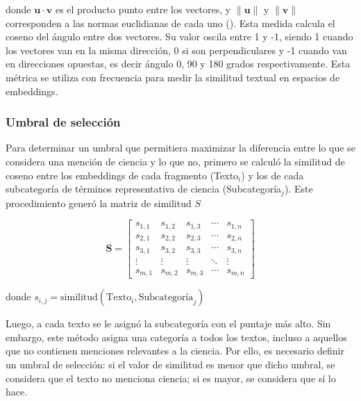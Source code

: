 \documentclass[11pt,a4paper]{article}
\begin{document}
	donde $\mathbf{u} \cdot \mathbf{v}$ es el producto punto entre los vectores, y 
	$\|\mathbf{u}\|$ y $\|\mathbf{v}\|$ corresponden a las normas euclidianas de cada uno (\cite{Jurafsky2025}). Esta medida calcula el coseno del ángulo entre dos vectores. Su valor oscila entre 1 y -1, siendo 1 cuando los vectores van en la misma dirección, 0 si son perpendiculares y -1 cuando van en direcciones opuestas, es decir ángulo 0, 90 y 180 grados respectivamente. Esta métrica se utiliza con frecuencia para medir la similitud textual en espacios de embeddings.\\
	
	

	\subsubsection{Umbral de selección}
	
	
	Para determinar un umbral que permitiera maximizar la diferencia entre lo que se considera una mención de ciencia y lo que no, primero se calculó la similitud de coseno entre los embeddings de cada fragmento (Texto$_i$) y los de cada subcategoría de términos representativa de ciencia (Subcategoría$_j$). Este procedimiento generó la matriz de similitud $S$
	
	\begin{equation}
		\mathbf{S} =
		\begin{bmatrix}
			s_{1,1} & s_{1,2} & s_{1,3} & \cdots & s_{1,n} \\
			s_{2,1} & s_{2,2} & s_{2,3} & \cdots & s_{2,n} \\
			s_{3,1} & s_{3,2} & s_{3,3} & \cdots & s_{3,n} \\
			\vdots  & \vdots  & \vdots  & \ddots & \vdots  \\
			s_{m,1} & s_{m,2} & s_{m,3} & \cdots & s_{m,n}
		\end{bmatrix}
	\end{equation}
	
	donde $ s_{i,j} = \text{similitud}( \text{Texto}_i, \text{Subcategoría}_j )$
	
	Luego, a cada texto se le asignó la subcategoría con el puntaje más alto. Sin embargo, este método asigna una categoría a todos los textos, incluso a aquellos que no contienen menciones relevantes a la ciencia. Por ello, es necesario definir un umbral de selección: si el valor de similitud es menor que dicho umbral, se considera que el texto no menciona ciencia; si es mayor, se considera que sí lo hace.
	
\end{document}
